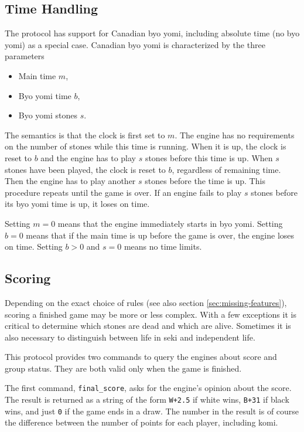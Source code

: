 \documentclass[a4paper]{article}
\begin{document}
\subsection{Time Handling}
\label{sec:time-handling}

The protocol has support for Canadian byo yomi, including absolute
time (no byo yomi) as a special case. Canadian byo yomi is
characterized by the three parameters
\begin{itemize}
\item Main time $m$,
\item Byo yomi time $b$,
\item Byo yomi stones $s$.
\end{itemize}
The semantics is that the clock is first set to $m$. The
engine has no requirements on the number of stones while this time is
running. When it is up, the clock is reset to $b$ and the
engine has to play $s$ stones before this time is up. When $s$ stones
have been played, the clock is reset to $b$, regardless of
remaining time. Then the engine has to play another $s$ stones before
the time is up. This procedure repeats until the game is over. If an
engine fails to play $s$ stones before its byo yomi time is up, it
loses on time.

Setting $m=0$ means that the engine immediately starts in byo yomi.
Setting $b=0$ means that if the main time is up before the game is
over, the engine loses on time. Setting $b>0$ and $s=0$ means no time
limits.

\subsection{Scoring}
\label{sec:scoring}

Depending on the exact choice of rules (see also section
\ref{sec:missing-features}), scoring a finished game may be more or
less complex. With a few exceptions it is critical to determine which
stones are dead and which are alive. Sometimes it is also necessary to
distinguish between life in seki and independent life.

This protocol provides two commands to query the engines about score
and group status. They are both valid only when the game is finished.

The first command, \texttt{final\_score}, asks for the engine's
opinion about the score. The result is returned as a string of the
form \texttt{W+2.5} if white wins, \texttt{B+31} if black wins, and
just \texttt{0} if the game ends in a draw. The number in the result
is of course the difference between the number of points for each
player, including komi.
\end{document}

